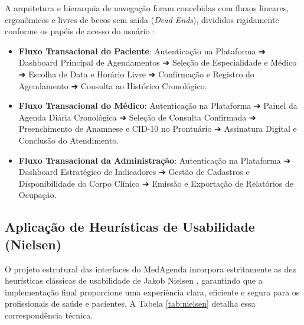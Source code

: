 A arquitetura e hierarquia de navegação foram concebidas com fluxos lineares, ergonômicos e livres de becos sem saída (\textit{Dead Ends}), divididos rigidamente conforme os papéis de acesso do usuário \cite{norman2013}:
\begin{itemize}
    \item \textbf{Fluxo Transacional do Paciente}: Autenticação na Plataforma ➔ Dashboard Principal de Agendamentos ➔ Seleção de Especialidade e Médico ➔ Escolha de Data e Horário Livre ➔ Confirmação e Registro do Agendamento ➔ Consulta ao Histórico Cronológico.
    \item \textbf{Fluxo Transacional do Médico}: Autenticação na Plataforma ➔ Painel da Agenda Diária Cronológica ➔ Seleção de Consulta Confirmada ➔ Preenchimento de Anamnese e CID-10 no Prontuário ➔ Assinatura Digital e Conclusão do Atendimento.
    \item \textbf{Fluxo Transacional da Administração}: Autenticação na Plataforma ➔ Dashboard Estratégico de Indicadores ➔ Gestão de Cadastros e Disponibilidade do Corpo Clínico ➔ Emissão e Exportação de Relatórios de Ocupação.
\end{itemize}

\subsection{Aplicação de Heurísticas de Usabilidade (Nielsen)}

O projeto estrutural das interfaces do MedAgenda incorpora estritamente as dez heurísticas clássicas de usabilidade de Jakob Nielsen \cite{nielsen1993, norman2013}, garantindo que a implementação final proporcione uma experiência clara, eficiente e segura para os profissionais de saúde e pacientes. A Tabela \ref{tab:nielsen} detalha essa correspondência técnica.

